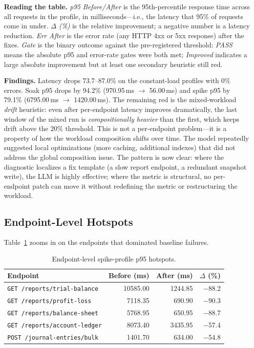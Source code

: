 \documentclass[conference]{IEEEtran}
\begin{document}
\textbf{Reading the table.} \emph{p95 Before/After} is the 95th-percentile response time across all requests in the profile, in milliseconds---i.e., the latency that 95\% of requests come in under. \emph{$\Delta$ (\%)} is the relative improvement; a negative number is a latency reduction. \emph{Err After} is the error rate (any HTTP 4xx or 5xx response) after the fixes. \emph{Gate} is the binary outcome against the pre-registered threshold: \emph{PASS} means the absolute p95 and error-rate gates were both met; \emph{Improved} indicates a large absolute improvement but at least one secondary heuristic still red.

\textbf{Findings.} Latency drops 73.7--87.0\% on the constant-load profiles with 0\% errors. Soak p95 drops by 94.2\% (970.95\,ms $\rightarrow$ 56.00\,ms) and spike p95 by 79.1\% (6795.00\,ms $\rightarrow$ 1420.00\,ms). The remaining red is the mixed-workload \emph{drift} heuristic: even after per-endpoint latency improves dramatically, the last window of the mixed run is \emph{compositionally heavier} than the first, which keeps drift above the 20\% threshold. This is not a per-endpoint problem---it is a property of how the workload composition shifts over time. The model repeatedly suggested local optimizations (more caching, additional indexes) that did not address the global composition issue. The pattern is now clear: where the diagnostic localizes a fix template (a slow report endpoint, a redundant snapshot write), the LLM is highly effective; where the metric is structural, no per-endpoint patch can move it without redefining the metric or restructuring the workload.

\subsection{Endpoint-Level Hotspots}\label{sec:hotspots}
Table~\ref{tab:hotspots} zooms in on the endpoints that dominated baseline failures.

\begin{table}[t]
\caption{Endpoint-level spike-profile p95 hotspots.}
\label{tab:hotspots}
\centering
\begin{tabular}{lrrr}
\toprule
Endpoint & Before (ms) & After (ms) & $\Delta$ (\%) \\
\midrule
\texttt{GET /reports/trial-balance}  & 10585.00 & 1244.85 & $-$88.2 \\
\texttt{GET /reports/profit-loss}    &  7118.35 &  690.90 & $-$90.3 \\
\texttt{GET /reports/balance-sheet}  &  5768.95 &  650.95 & $-$88.7 \\
\texttt{GET /reports/account-ledger} &  8073.40 & 3435.95 & $-$57.4 \\
\texttt{POST /journal-entries/bulk}  &  1401.70 &  634.00 & $-$54.8 \\
\bottomrule
\end{tabular}
\end{table}
\end{document}
